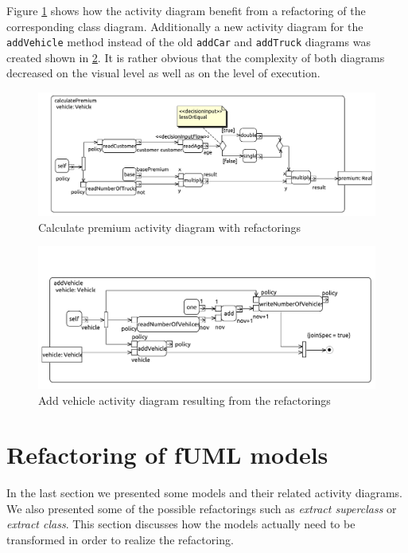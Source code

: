 \documentclass{llncs}
\begin{document}
Figure \ref{fig:calculatePremiumRef} shows how the activity diagram benefit from a refactoring of the corresponding 
class diagram. Additionally a new activity diagram for the \lstinline|addVehicle| method instead of the old 
\lstinline|addCar| and \lstinline|addTruck| diagrams was created shown in \ref{fig:addCarRef}. It is rather obvious 
that the complexity of both diagrams decreased on the visual level as well as on the level of execution.

\begin{figure}[h!t]
 \centering
 \includegraphics[scale=0.5]{images/insurance_ref/Activity_calculatePremium_calculatePremium}
 \caption{Calculate premium activity diagram with refactorings}
 \label{fig:calculatePremiumRef}
\end{figure}

\begin{figure}[ht]
 \centering
 \includegraphics[scale=0.6]{images/insurance_ref/Activity_addVehicle_addVehicle}
 \caption{Add vehicle activity diagram resulting from the refactorings}
 \label{fig:addCarRef}
\end{figure}

\section{Refactoring of fUML models}
\label{sec:fuml-refactoring}

In the last section we presented some models and their related activity diagrams. We also presented some of the possible 
refactorings such as \textit{extract superclass} or \textit{extract class}. This section discusses how the models actually 
need to be transformed in order to realize the refactoring.
\end{document}

